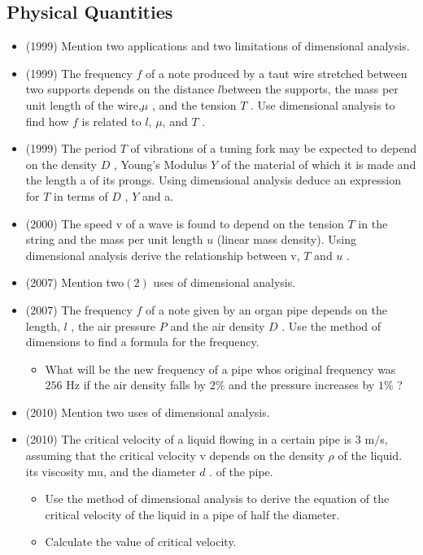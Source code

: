 \documentclass{article}
\begin{document}
\subsection{Physical Quantities}
\begin{itemize}
\item (1999)  Mention two applications and two limitations of dimensional analysis.
\item (1999)  The frequency $ f$ of a note produced by a taut wire stretched between two supports depends on the distance ​ $ l$ ​ between the supports, the mass per unit length of the wire,$ \mu $ , and the tension $ T$ . Use dimensional analysis to find how $ f$ is related to ​ $ l$ ​ , $\mu$, and $ T$ .
\item (1999)  The period $ T$ of vibrations of a tuning fork may be expected to depend on the density $ D$ , Young's Modulus $ Y$ of the material of which it is made and the length a of its prongs. Using dimensional analysis deduce an expression for $ T$ in terms of $ D$ , $ Y$ and a.
\item (2000)  The speed v of a wave is found to depend on the tension $ T$ in the string and the mass per unit length $ u$ (linear mass density). Using dimensional analysis derive the relationship between v, $ T$ and $ u$ .
\item (2007)  Mention two$ (2)$ uses of dimensional analysis.
\item (2007)  The frequency $ f$ of a note given by an organ pipe depends on the length, $ l$ , the air pressure $ P$ and the air density $ D$ .  Use the method of dimensions to find a formula for the frequency.\begin{itemize}
\item What will be the new frequency of a pipe whos original frequency was $ 256$ Hz if the air density falls by $ 2\%$ and the pressure increases by $ 1\%$ ?
\end{itemize}
\item (2010)  Mention two uses of dimensional analysis.
\item (2010)  The critical velocity of a liquid flowing in a certain pipe is $ 3$ m$/$s, assuming that the critical velocity v depends on the density $ \rho $ of the liquid. its viscosity mu, and the diameter $ d$ . of the pipe. \begin{itemize}
\item Use the method of dimensional analysis to derive the equation of the critical velocity of the liquid in a pipe of half the diameter.
\item Calculate the value of critical velocity.

\end{itemize}
\end{itemize}
\end{document}
